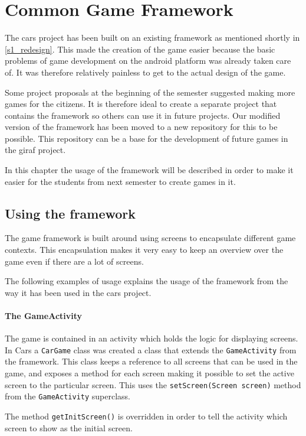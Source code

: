 \section{Common Game Framework}
The cars project has been built on an existing framework as mentioned shortly in \cref{s1_redesign}. 
This made the creation of the game easier because the basic problems of game development on the android platform was already taken care of.
It was therefore relatively painless to get to the actual design of the game. 

Some project proposals at the beginning of the semester suggested making more games for the citizens.
It is therefore ideal to create a separate project that contains the framework so others can use it in future projects.
Our modified version of the framework has been moved to a new repository for this to be possible.
This repository can be a base for the development of future games in the giraf project.

In this chapter the usage of the framework will be described in order to make it easier for the students from next semester to create games in it.

\subsection{Using the framework}
The game framework is built around using screens to encapsulate different game contexts. 
This encapsulation makes it very easy to keep an overview over the game even if there are a lot of screens.

The following examples of usage explains the usage of the framework from the way it has been used in the cars project.

\paragraph{The GameActivity}
The game is contained in an activity which holds the logic for displaying screens.
In Cars a \lstinline|CarGame| class was created a class  that extends the \lstinline|GameActivity| from the framework. 
This class keeps a reference to all screens that can be used in the game, and exposes a method for each screen making it possible to set the active screen to the particular screen.
This uses the \lstinline|setScreen(Screen screen)| method from the \lstinline|GameActivity| superclass. 

The method \lstinline|getInitScreen()| is overridden in order to tell the activity which screen to show as the initial screen.

